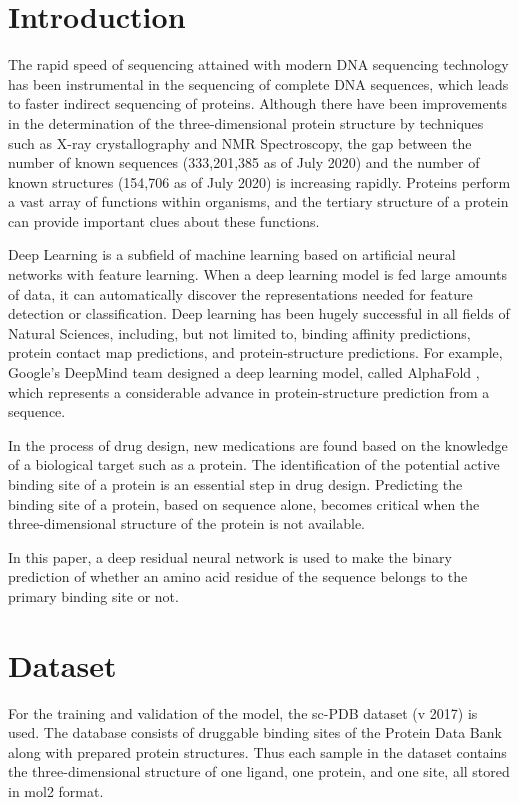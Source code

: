 \documentclass[journal=jacsat,manuscript=article]{achemso}
\begin{document}
\section{Introduction}
\quad The rapid speed of sequencing attained with modern DNA sequencing technology has been instrumental in the sequencing of complete DNA sequences, which leads to faster indirect sequencing of proteins. Although there have been improvements in the determination of the three-dimensional protein structure by techniques such as X-ray crystallography and NMR Spectroscopy, the gap between the number of known sequences (333,201,385 as of July 2020) and the number of known structures (154,706 as of July 2020) is increasing rapidly. Proteins perform a vast array of functions within organisms, and the tertiary structure of a protein can provide important clues about these functions.

Deep Learning is a subfield of machine learning based on artificial neural networks with feature learning. When a deep learning model is fed large amounts of data, it can automatically discover the representations needed for feature detection or classification. Deep learning has been hugely successful in all fields of Natural Sciences, including, but not limited to, binding affinity predictions, protein contact map predictions, and protein-structure predictions. For example, Google's DeepMind team designed a deep learning model, called AlphaFold \cite{senior2020improved}, which represents a considerable advance in protein-structure prediction from a sequence.

In the process of drug design, new medications are found based on the knowledge of a biological target such as a protein. The identification of the potential active binding site of a protein is an essential step in drug design. Predicting the binding site of a protein, based on sequence alone, becomes critical when the three-dimensional structure of the protein is not available.

In this paper, a deep residual neural network is used to make the binary prediction of whether an amino acid residue of the sequence belongs to the primary binding site or not.

\section{Dataset}
\quad For the training and validation of the model, the sc-PDB\cite{desaphy2015sc} dataset (v 2017) is used. The database consists of druggable binding sites of the Protein Data Bank along with prepared protein structures. Thus each sample in the dataset contains the three-dimensional structure of one ligand, one protein, and one site, all stored in mol2 format.
\end{document}
